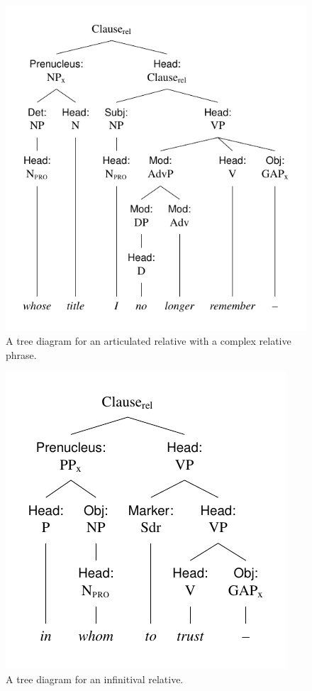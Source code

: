 \begin{figure}[ht]
    \centering
    \includegraphics{figures/whose-title-I-no-longer-remember.pdf}
    \caption{A tree diagram for an articulated relative with a complex relative phrase.}
    \label{fig:whose-title-I}
\end{figure}

\begin{figure}[ht]
    \centering
    \includegraphics{figures/in-whom-to-trust.pdf}
    \caption{A tree diagram for an infinitival relative.}
    \label{fig:in-whom-to-trust}
\end{figure}

